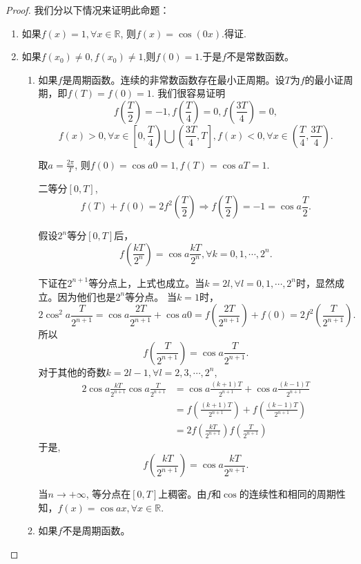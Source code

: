\documentclass[utf8]{book}
\begin{document}
\begin{proof}我们分以下情况来证明此命题：
\renewcommand\labelenumi{\normalfont(\theenumi)}
\begin{enumerate}
\item 如果$f(x)=1, \forall x\in\mathbb{R}$, 则$f(x)=\cos(0x)$.得证. 
\item 如果$f(x_0)\neq 0, f(x_0)\neq 1$,则$f(0)=1$.于是$f$不是常数函数。
\renewcommand\labelenumi{\normalfont(\theenumi)}
\begin{enumerate}
\item 如果$f$是周期函数。连续的非常数函数存在最小正周期。设$T$为$f$的最小证周期，即$f(T)=f(0)=1$. 我们很容易证明
$$f\left(\frac{T}{2}\right) = -1, f\left(\frac{T}{4}\right)=0, f\left(\frac{3T}{4}\right)=0,$$
$$f(x) > 0, \forall x\in\left[0,\frac{T}{4}\right)\bigcup \left(\frac{3T}{4}, T\right],f(x) < 0, \forall x\in\left(\frac{T}{4},\frac{3T}{4}\right).$$

取$a=\displaystyle\frac{2\pi}{T}$, 则$f(0) = \cos{a0}=1, f(T)=\cos{aT}=1.$

二等分$[0,T]$, $$f(T)+f(0)=2f^2\left(\frac{T}{2}\right)\Rightarrow f\left(\frac{T}{2}\right)=-1=\cos{a\frac{T}{2}}.$$

假设$2^n$等分$[0,T]$后，$$f\left(\frac{kT}{2^n}\right)=\cos{a\frac{kT}{2^n}}, \forall k=0,1,\cdots,2^n.$$

下证在$2^{n+1}$等分点上，上式也成立。当$k=2l,\forall l=0,1,\cdots,2^n$时，显然成立。因为他们也是$2^n$等分点。
当$k=1$时，$$2\cos^2{a\frac{T}{2^{n+1}}}=\cos{a\frac{2T}{2^{n+1}}}+\cos{a0}=f\left(\frac{2T}{2^{n+1}}\right)+f(0)=2f^2\left(\frac{T}{2^{n+1}}\right).$$
所以$$f\left(\frac{T}{2^{n+1}}\right)=\cos{a\frac{T}{2^{n+1}}}.$$
对于其他的奇数$k=2l-1,\forall l=2,3,\cdots,2^n$,
\begin{equation*}
\begin{split}
2\cos{a\frac{kT}{2^{n+1}}}\cos{a\frac{T}{2^{n+1}}}&=\cos{a\frac{(k+1)T}{2^{n+1}}}+\cos{a\frac{(k-1)T}{2^{n+1}}}\\&=f\left(\frac{(k+1)T}{2^{n+1}}\right)+f\left(\frac{(k-1)T}{2^{n+1}}\right)\\&=2f\left(\frac{kT}{2^{n+1}}\right)f\left(\frac{T}{2^{n+1}}\right)
\end{split}
\end{equation*}
于是, $$f\left(\frac{kT}{2^{n+1}}\right)=\cos{a\frac{kT}{2^{n+1}}}.$$

当$n\to +\infty$, 等分点在$[0,T]$上稠密。由$f$和$\cos$的连续性和相同的周期性知，$f(x)=\cos{ax},\forall x\in\mathbb{R}$.
\item 如果$f$不是周期函数。
\end{enumerate}
\end{enumerate}
\end{proof}
\end{document}
